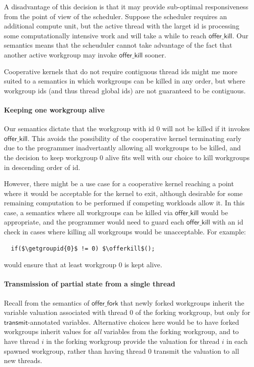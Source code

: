 \documentclass[numbers,nocopyrightspace,10pt]{sigplanconf}
\newcommand{\transmit}{\mathsf{transmit}}
\newcommand{\offerfork}{\mathsf{offer\_fork}}
\newcommand{\offerkill}{\mathsf{offer\_kill}}
\newcommand{\getgroupid}{\mathsf{get\_group\_id}}
\begin{document}
A disadvantage of this decision is that it may provide sub-optimal
responsiveness from the point of view of the scheduler.  Suppose the
scheduler requires an additional compute unit, but the active thread
with the larget id is processing some computationally intensive work
and will take a while to reach $\offerkill$.  Our semantics means that
the scheuduler cannot take advantage of the fact that another active
workgroup may invoke $\offerkill$ sooner.

Cooperative kernels that do not require contiguous thread ids might me
more suited to a semantics in which workgroups can be killed in any
order, but where workgroup ids (and thus thread global ids) are not
guaranteed to be contiguous.

\paragraph{Keeping one workgroup alive}

Our semantics dictate that the workgroup with id 0 will not be killed
if it invokes $\offerkill$.  This avoids the possibility of the
cooperative kernel terminating early due to the programmer
inadvertantly allowing all workgroups to be killed, and the decision
to keep workgroup 0 alive fits well with our choice to kill workgroups
in descending order of id.

However, there might be a use case for a cooperative kernel reaching a
point where it would be acceptable for the kernel to exit, although
desirable for some remaining computation to be performed if competing
workloads allow it.  In this case, a semantics where all workgroups can be killed via $\offerkill$ would be appropriate, and the programmer would need to guard each $\offerkill$ with an id check in cases where killing all workgroups would be unacceptable.  For example:
%
\lstset{basicstyle=\tt,numbers=none}
\begin{lstlisting}
  if($\getgroupid{0}$ != 0) $\offerkill$();
\end{lstlisting}
\lstset{basicstyle=\scriptsize\tt,numbers=left}
%
would ensure that at least workgroup 0 is kept alive.

\paragraph{Transmission of partial state from a single thread}

Recall from the semantics of $\offerfork$ that newly forked workgroups
inherit the variable valuation associated with thread 0 of the forking
workgroup, but only for $\transmit$-annotated variables.  Alternative
choices here would be to have forked workgroups inherit values for
\emph{all} variables from the forking workgroup, and to have thread
$i$ in the forking workgroup provide the valuation for thread $i$ in
each spawned workgroup, rather than having thread 0 transmit the
valuation to all new threads.
\end{document}
